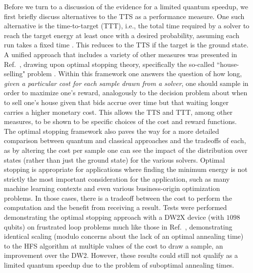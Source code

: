 Before we turn to a discussion of the evidence for a limited quantum speedup, we first briefly discuss alternatives to the TTS as a performance measure. One such alternative is the time-to-target (TTT), i.e., the total time required by a solver
to reach the target energy at least once with a desired probability, assuming each run takes a fixed time \cite{King:2015cs}. This reduces to the TTS if the target is the ground state. A unified approach that includes a variety of other measures was presented in Ref.~\cite{Vinci:2016tg}, drawing upon optimal stopping theory, specifically the so-called ``house-selling" problem \cite{Ferguson:book}. Within this framework one answers the question of how long, \emph{given a particular cost for each sample drawn from a solver}, one should sample in order to maximize one's reward, analogously to the decision problem about when to sell one's house given that bids accrue over time but that waiting longer carries a higher monetary cost. This allows the TTS and TTT, among other measures, to be shown to be specific choices of the cost and reward functions. The optimal stopping framework also paves the way for a more detailed comparison between quantum and classical approaches and the tradeoffs of each, as by altering the cost per sample one can see the impact of the distribution over states (rather than just the ground state) for the various solvers. Optimal stopping is appropriate for applications where finding the minimum energy is not strictly the most important consideration for the application, such as many machine learning contexts and even various business-origin optimization problems. In those cases, there is a tradeoff between the cost to perform the computation and the benefit from receiving a result. Tests were performed demonstrating the optimal stopping approach with a DW2X device (with $1098$ qubits) on frustrated loop problems much like those in Ref.~\cite{Hen:2015rt}, demonstrating identical scaling (modulo concerns about the lack of an optimal annealing time) to the HFS algorithm at multiple values of the cost to draw a sample, an improvement over the DW2. However, these results could still not qualify as a limited quantum speedup due to the problem of suboptimal annealing times.

